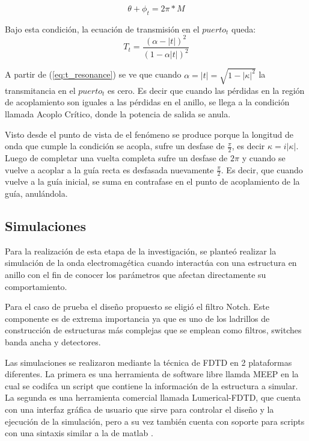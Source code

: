 \documentclass{IEEEtran}
\begin{document}
\begin{equation}
\theta + \phi_t = 2\pi * M
\label{eq:resonance_condition}
\end{equation} 

Bajo esta condición, la ecuación de transmisión en el $puerto_t$ queda:
\begin{equation}
T_t=\frac{(\alpha - |t|)^2}{(1-\alpha|t|)^2}
\label{eq:t_resonance}
\end{equation} 

A partir de (\ref{eq:t_resonance}) se ve que cuando $\alpha=|t|=\sqrt{1-|\kappa|^2}$ la transmitancia
en el $puerto_t$ es cero. Es decir que cuando las pérdidas en la región de 
acoplamiento son iguales a las pérdidas en el anillo, se llega a la condición
llamada Acoplo Crítico, donde la potencia de salida se anula.

Visto desde el punto de vista de \cite{blasco2011desarrollo} el fenómeno se 
produce porque la longitud de onda que cumple la condición se acopla, sufre un 
desfase de $\frac{\pi}{2}$, es decir $\kappa = i|\kappa|$. 
Luego de completar una vuelta completa sufre un desfase de $2\pi$ y cuando
se vuelve a acoplar a la guía recta es desfasada nuevamente $\frac{\pi}{2}$.
Es decir, que cuando vuelve a la guía inicial, se suma en contrafase en el 
punto de acoplamiento de la guía, anulándola.

\subsection{Simulaciones}
Para la realización de esta etapa de la investigación, se planteó realizar la simulación
de la onda electromagética cuando interactúa con una estructura en anillo con el fin de 
conocer los parámetros que afectan directamente su comportamiento.

Para el caso de prueba el diseño propuesto se eligió el filtro Notch.
Este componente es de extrema importancia ya que es uno de los ladrillos de construcción
de estructuras más complejas que se emplean como filtros, switches banda ancha y detectores.

Las simulaciones se realizaron mediante la técnica de FDTD en 2 plataformas diferentes. 
La primera es una herramienta de software libre llamda MEEP en la cual se codifca un 
script que contiene la información de la estructura a simular.
La segunda es una herramienta comercial llamada Lumerical-FDTD, que cuenta con una interfaz
gráfica de usuario que sirve para controlar el diseño y la ejecución de la simulación, pero
a su vez también cuenta con soporte para scripts con una sintaxis similar a la de matlab 
.
\end{document}
